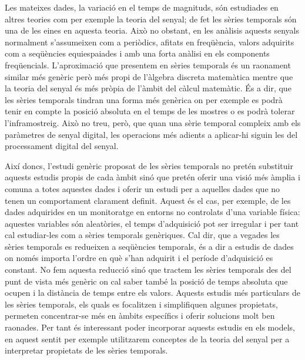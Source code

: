 Les mateixes dades, la variació en el temps de magnituds, són
estudiades en altres teories com per exemple la teoria del senyal; de
fet les sèries temporals són una de les eines en aquesta teoria.  Això
no obstant, en les anàlisis aquests senyals normalment s'assumeixen
com a periòdics, afitats en freqüència, valors adquirits com a
seqüències equiespaiades i amb una forta anàlisi en els components
freqüencials. %
L'aproximació que presentem en sèries temporals és un raonament
similar més genèric però més propi de l'àlgebra discreta matemàtica
mentre que la teoria del senyal és més pròpia de l'àmbit del càlcul
matemàtic. És a dir, que les sèries temporals tindran una forma més
genèrica on per exemple es podrà tenir en compte la posició absoluta
en el temps de les mostres o es podrà tolerar l'inframostreig.  Això
no treu, però, que quan una sèrie temporal compleix amb els paràmetres
de senyal digital, les operacions més adients a aplicar-hi siguin les
del processament digital del senyal.




Així doncs, l'estudi genèric proposat de les sèries temporals no
pretén substituir aquests estudis propis de cada àmbit sinó que pretén
oferir una visió més àmplia i comuna a totes aquestes dades i oferir
un estudi per a aquelles dades que no tenen un comportament clarament
definit. Aquest és el cas, per exemple, de les dades adquirides en un
monitoratge en entorns no controlats d'una variable física: aquestes
variables són aleatòries, el temps d'adquisició pot ser irregular i
per tant cal estudiar-les com a sèries temporals genèriques.
Cal dir, que a vegades les sèries temporals es redueixen a seqüències
temporals, és a dir a estudis de dades on només importa l'ordre en què
s'han adquirit i el període d'adquisició es constant. No fem
aquesta reducció sinó que tractem les sèries temporals des del punt de
vista més genèric on cal saber també la posició de temps absoluta que
ocupen i la distància de temps entre els valors.
Aquests estudis més particulars de les sèries temporals, els quals es
focalitzen i simplifiquen algunes propietats, permeten concentrar-se
més en àmbits específics i oferir solucions molt ben raonades.  Per
tant és interessant poder incorporar aquests estudis en els models, en
aquest sentit per exemple utilitzarem conceptes de la teoria del
senyal per a interpretar propietats de les sèries temporals.




